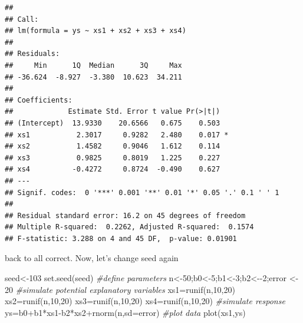 \documentclass[
]{book}
\newenvironment{Shaded}{\begin{snugshade}}{\end{snugshade}}
\newcommand{\AttributeTok}[1]{\textcolor[rgb]{0.77,0.63,0.00}{#1}}
\newcommand{\CommentTok}[1]{\textcolor[rgb]{0.56,0.35,0.01}{\textit{#1}}}
\newcommand{\DecValTok}[1]{\textcolor[rgb]{0.00,0.00,0.81}{#1}}
\newcommand{\FunctionTok}[1]{\textcolor[rgb]{0.00,0.00,0.00}{#1}}
\newcommand{\NormalTok}[1]{#1}
\newcommand{\OtherTok}[1]{\textcolor[rgb]{0.56,0.35,0.01}{#1}}
\newcommand{\SpecialCharTok}[1]{\textcolor[rgb]{0.00,0.00,0.00}{#1}}
\begin{document}
\begin{verbatim}
## 
## Call:
## lm(formula = ys ~ xs1 + xs2 + xs3 + xs4)
## 
## Residuals:
##     Min      1Q  Median      3Q     Max 
## -36.624  -8.927  -3.380  10.623  34.211 
## 
## Coefficients:
##             Estimate Std. Error t value Pr(>|t|)  
## (Intercept)  13.9330    20.6566   0.675    0.503  
## xs1           2.3017     0.9282   2.480    0.017 *
## xs2           1.4582     0.9046   1.612    0.114  
## xs3           0.9825     0.8019   1.225    0.227  
## xs4          -0.4272     0.8724  -0.490    0.627  
## ---
## Signif. codes:  0 '***' 0.001 '**' 0.01 '*' 0.05 '.' 0.1 ' ' 1
## 
## Residual standard error: 16.2 on 45 degrees of freedom
## Multiple R-squared:  0.2262, Adjusted R-squared:  0.1574 
## F-statistic: 3.288 on 4 and 45 DF,  p-value: 0.01901
\end{verbatim}

back to all correct. Now, let's change seed again

\begin{Shaded}
\begin{Highlighting}[]
\NormalTok{seed}\OtherTok{\textless{}{-}}\DecValTok{103}
\FunctionTok{set.seed}\NormalTok{(seed)}
\CommentTok{\#define parameters}
\NormalTok{n}\OtherTok{\textless{}{-}}\DecValTok{50}\NormalTok{;b0}\OtherTok{\textless{}{-}}\DecValTok{5}\NormalTok{;b1}\OtherTok{\textless{}{-}}\DecValTok{3}\NormalTok{;b2}\OtherTok{\textless{}{-}}\SpecialCharTok{{-}}\DecValTok{2}\NormalTok{;error }\OtherTok{\textless{}{-}} \DecValTok{20}
\CommentTok{\#simulate potential explanatory variables}
\NormalTok{xs1}\OtherTok{=}\FunctionTok{runif}\NormalTok{(n,}\DecValTok{10}\NormalTok{,}\DecValTok{20}\NormalTok{)}
\NormalTok{xs2}\OtherTok{=}\FunctionTok{runif}\NormalTok{(n,}\DecValTok{10}\NormalTok{,}\DecValTok{20}\NormalTok{)}
\NormalTok{xs3}\OtherTok{=}\FunctionTok{runif}\NormalTok{(n,}\DecValTok{10}\NormalTok{,}\DecValTok{20}\NormalTok{)}
\NormalTok{xs4}\OtherTok{=}\FunctionTok{runif}\NormalTok{(n,}\DecValTok{10}\NormalTok{,}\DecValTok{20}\NormalTok{)}
\CommentTok{\#simulate response}
\NormalTok{ys}\OtherTok{=}\NormalTok{b0}\SpecialCharTok{+}\NormalTok{b1}\SpecialCharTok{*}\NormalTok{xs1}\SpecialCharTok{{-}}\NormalTok{b2}\SpecialCharTok{*}\NormalTok{xs2}\SpecialCharTok{+}\FunctionTok{rnorm}\NormalTok{(n,}\AttributeTok{sd=}\NormalTok{error)}
\CommentTok{\#plot data}
\FunctionTok{plot}\NormalTok{(xs1,ys)}
\end{Highlighting}
\end{Shaded}
\end{document}
